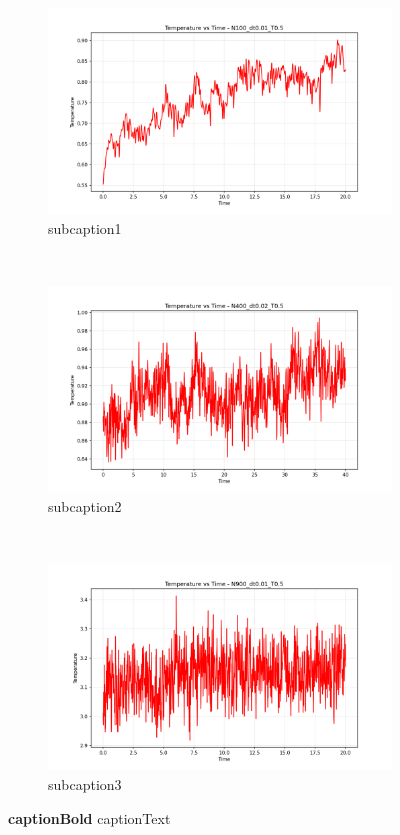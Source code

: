 \begin{figure}[H]
	\centering
	\begin{subfigure}{0.5\textwidth}
		\includegraphics[width=\textwidth]{media/temp_N100_dt0.01_T0.5.png}
		\caption{subcaption1}
		\label{sfig:sublabel1}
	\end{subfigure}%
	~
	\begin{subfigure}{0.5\textwidth}
		\includegraphics[width=\textwidth]{media/temp_N400_dt0.02_T0.5.png}
		\caption{subcaption2}
		\label{sfig:sublabel2}
	\end{subfigure}
	~
	\begin{subfigure}{0.5\textwidth}
		\includegraphics[width=\textwidth]{media/temp_N900_dt0.01_T0.5.png}
		\caption{subcaption3}
		\label{sfig:sublabel3}
	\end{subfigure}%
	\caption{\textbf{captionBold}
		captionText
	}
	\label{fig:figureLabel}
\end{figure}
